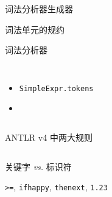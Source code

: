 
\begin{frame}{}
  \begin{center}
    词法分析器生成器
  \end{center}
\end{frame}

\begin{frame}{}
  \begin{center}
     词法单元的规约

    \vspace{0.50cm}
    \texttt{}

    \vspace{1.00cm}
     词法分析器

    \begin{columns}
        \begin{itemize}
          \setlength{\itemsep}{8pt}
          \item \texttt{SimpleExpr.tokens}
          \item \texttt{}
        \end{itemize}
    \end{columns}


  \end{center}
\end{frame}

\begin{frame}{}
\end{frame}

\begin{frame}{}
  \begin{center}
    ANTLR v4 中两大规则

    \vspace{1.20cm}
	\begin{columns}[]
	  \begin{description}
		\setlength{\itemsep}{15pt}
		\item[最前优先匹配:] 关键字 \emph{vs.} 标识符
		\item[最长优先匹配:] \texttt{>=}, \texttt{ifhappy}, \texttt{thenext}, \texttt{1.23}
	  \end{description}
	\end{columns}
  \end{center}
\end{frame}
